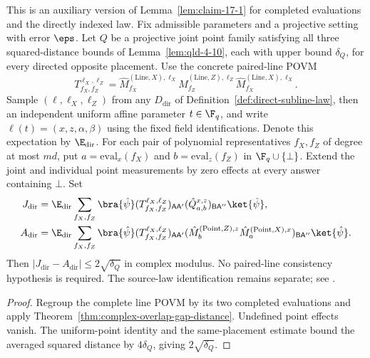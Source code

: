 \begin{theorem}
	\label{thm:claim-17-1-direct}
	\leanok
	This is an auxiliary version of Lemma~\ref{lem:claim-17-1} for completed
	evaluations and the directly indexed law. Fix admissible parameters and
	a projective setting with error $\eps$. Let $Q$ be a projective joint
	point family satisfying all three squared-distance bounds of
	Lemma~\ref{lem:qld-4-10}, each with upper bound $\delta_Q$, for every
	directed opposite placement. Use the concrete paired-line POVM
	\[
		T^{\ell_X,\ell_Z}_{f_X,f_Z}
		=\hat M^{(\mathrm{Line},X),\ell_X}_{f_X}
		 \hat M^{(\mathrm{Line},Z),\ell_Z}_{f_Z}
		 \hat M^{(\mathrm{Line},X),\ell_X}_{f_X}.
	\]
	Sample $(\ell,\ell_X,\ell_Z)$ from any $D_{\mathrm{dir}}$ of
	Definition~\ref{def:direct-subline-law}, then an independent uniform
	affine parameter $t\in\F_q$, and write
	$\ell(t)=(x,z,\alpha,\beta)$ using the fixed field identifications.
	Denote this expectation by $\E_{\mathrm{dir}}$. For each pair of
	polynomial representatives $f_X,f_Z$ of degree at most $md$, put
	$a=\mathrm{eval}_x(f_X)$ and $b=\mathrm{eval}_z(f_Z)$ in
	$\F_q\cup\{\bot\}$. Extend the joint and individual point measurements
	by zero effects at every answer containing $\bot$. Set
	\begin{align*}
		J_{\mathrm{dir}}&=\E_{\mathrm{dir}}\sum_{f_X,f_Z}
		\bra{\hat\psi}(T^{\ell_X,\ell_Z}_{f_X,f_Z})_{\mathsf{A}\mathsf{A}'}
		(\hat Q^{x,z}_{a,b})_{\mathsf{B}\mathsf{A}''}\ket{\hat\psi},\\
		A_{\mathrm{dir}}&=\E_{\mathrm{dir}}\sum_{f_X,f_Z}
		\bra{\hat\psi}(T^{\ell_X,\ell_Z}_{f_X,f_Z})_{\mathsf{A}\mathsf{A}'}
		(\hat M^{(\mathrm{Point},Z),z}_b
		 \hat M^{(\mathrm{Point},X),x}_a)_{\mathsf{B}\mathsf{A}''}
		\ket{\hat\psi}.
	\end{align*}
	Then $|J_{\mathrm{dir}}-A_{\mathrm{dir}}|\le2\sqrt{\delta_Q}$ in
	complex modulus. No paired-line consistency hypothesis is required.
	The source-law identification remains separate; see
	\cite{gap:qpbt_subline-claims-line-marginal}.
\end{theorem}
\begin{proof}
	\leanok
	Regroup the complete line POVM by its two completed evaluations and apply
	Theorem~\ref{thm:complex-overlap-gap-distance}. Undefined point effects
	vanish. The uniform-point identity and the same-placement estimate bound
	the averaged squared distance by $4\delta_Q$, giving $2\sqrt{\delta_Q}$.
\end{proof}


